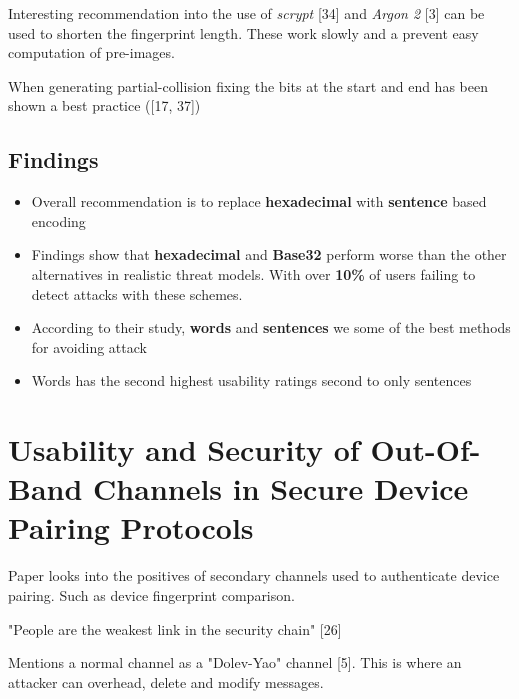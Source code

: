 Interesting recommendation into the use of \textit{scrypt} [34] and \textit{Argon 2} [3] can be used to shorten the fingerprint length. These work slowly and a prevent easy computation of pre-images.

When generating partial-collision fixing the bits at the start and end has been shown a best practice ([17, 37])

\subsection{Findings}
\begin{itemize}
    \item Overall recommendation is to replace \textbf{hexadecimal} with \textbf{sentence} based encoding
    \item Findings show that \textbf{hexadecimal} and \textbf{Base32} perform worse than the other alternatives in realistic threat models. With over \textbf{10\%} of users failing to detect attacks with these schemes.
    \item According to their study, \textbf{words} and \textbf{sentences} we some of the best methods for avoiding attack
    \item Words has the second highest usability ratings second to only sentences
\end{itemize}

\section{Usability and Security of Out-Of-Band Channels in Secure Device Pairing Protocols}

Paper looks into the positives of secondary channels used to authenticate device pairing. Such as device fingerprint comparison.

"People are the weakest link in the security chain" [26]

Mentions a normal channel as a "Dolev-Yao" channel [5]. This is where an attacker can overhead, delete and modify messages.


